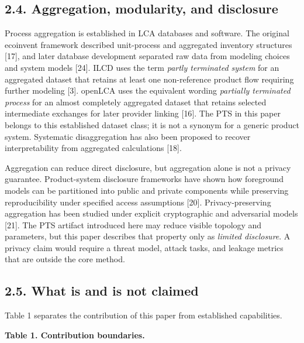 \documentclass[
  10pt,
  a4paper,
  DIV=11,
  numbers=noendperiod]{scrartcl}
\begin{document}
\subsection{2.4. Aggregation, modularity, and
disclosure}\label{aggregation-modularity-and-disclosure}

Process aggregation is established in LCA databases and software. The
original ecoinvent framework described unit-process and aggregated
inventory structures {[}17{]}, and later database development separated
raw data from modeling choices and system models {[}24{]}. ILCD uses the
term \emph{partly terminated system} for an aggregated dataset that
retains at least one non-reference product flow requiring further
modeling {[}3{]}. openLCA uses the equivalent wording \emph{partially
terminated process} for an almost completely aggregated dataset that
retains selected intermediate exchanges for later provider linking
{[}16{]}. The PTS in this paper belongs to this established dataset
class; it is not a synonym for a generic product system. Systematic
disaggregation has also been proposed to recover interpretability from
aggregated calculations {[}18{]}.

Aggregation can reduce direct disclosure, but aggregation alone is not a
privacy guarantee. Product-system disclosure frameworks have shown how
foreground models can be partitioned into public and private components
while preserving reproducibility under specified access assumptions
{[}20{]}. Privacy-preserving aggregation has been studied under explicit
cryptographic and adversarial models {[}21{]}. The PTS artifact
introduced here may reduce visible topology and parameters, but this
paper describes that property only as \emph{limited disclosure}. A
privacy claim would require a threat model, attack tasks, and leakage
metrics that are outside the core method.

\subsection{2.5. What is and is not
claimed}\label{what-is-and-is-not-claimed}

Table 1 separates the contribution of this paper from established
capabilities.

\textbf{Table 1. Contribution boundaries.}
\end{document}
